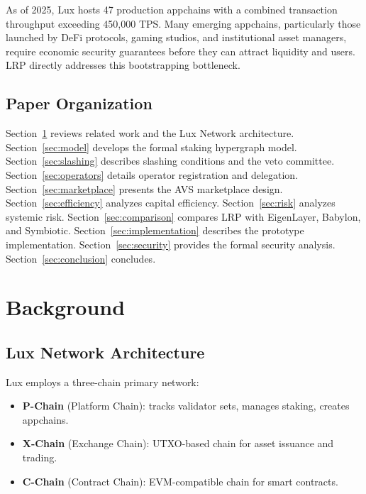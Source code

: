 \documentclass[11pt]{article}
\begin{document}
As of 2025, Lux hosts 47 production appchains with a combined transaction throughput
exceeding 450,000 TPS. Many emerging appchains, particularly those launched by DeFi protocols,
gaming studios, and institutional asset managers, require economic security guarantees before
they can attract liquidity and users. LRP directly addresses this bootstrapping bottleneck.

\subsection{Paper Organization}

Section~\ref{sec:background} reviews related work and the Lux Network architecture.
Section~\ref{sec:model} develops the formal staking hypergraph model.
Section~\ref{sec:slashing} describes slashing conditions and the veto committee.
Section~\ref{sec:operators} details operator registration and delegation.
Section~\ref{sec:marketplace} presents the AVS marketplace design.
Section~\ref{sec:efficiency} analyzes capital efficiency.
Section~\ref{sec:risk} analyzes systemic risk.
Section~\ref{sec:comparison} compares LRP with EigenLayer, Babylon, and Symbiotic.
Section~\ref{sec:implementation} describes the prototype implementation.
Section~\ref{sec:security} provides the formal security analysis.
Section~\ref{sec:conclusion} concludes.

\section{Background}
\label{sec:background}

\subsection{Lux Network Architecture}

Lux employs a three-chain primary network:
\begin{itemize}[leftmargin=1.5em]
  \item \textbf{P-Chain} (Platform Chain): tracks validator sets, manages staking, creates
    appchains.
  \item \textbf{X-Chain} (Exchange Chain): UTXO-based chain for asset issuance and trading.
  \item \textbf{C-Chain} (Contract Chain): EVM-compatible chain for smart contracts.
\end{itemize}
\end{document}
